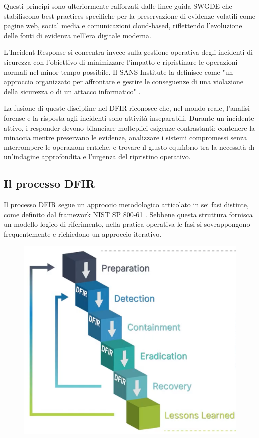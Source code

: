 Questi principi sono ulteriormente rafforzati dalle linee guida SWGDE \cite{swgde2022} che stabiliscono best practices specifiche per la preservazione di evidenze volatili come pagine web, social media e comunicazioni cloud-based, riflettendo l'evoluzione delle fonti di evidenza nell'era digitale moderna.

L'Incident Response si concentra invece sulla gestione operativa degli incidenti di sicurezza con l'obiettivo di minimizzare l'impatto e ripristinare le operazioni normali nel minor tempo possibile. Il SANS Institute la definisce come "un approccio organizzato per affrontare e gestire le conseguenze di una violazione della sicurezza o di un attacco informatico" \cite{sans2023}.

La fusione di queste discipline nel DFIR riconosce che, nel mondo reale, l'analisi forense e la risposta agli incidenti sono attività inseparabili. Durante un incidente attivo, i responder devono bilanciare molteplici esigenze contrastanti: contenere la minaccia mentre preservano le evidenze, analizzare i sistemi compromessi senza interrompere le operazioni critiche, e trovare il giusto equilibrio tra la necessità di un'indagine approfondita e l'urgenza del ripristino operativo.

\subsection{Il processo DFIR}

Il processo DFIR segue un approccio metodologico articolato in sei fasi distinte, come definito dal framework NIST SP 800-61 \cite{cichonski2012}. Sebbene questa struttura fornisca un modello logico di riferimento, nella pratica operativa le fasi si sovrappongono frequentemente e richiedono un approccio iterativo.

\begin{figure}[H]
    \centering
    \includegraphics[width=0.6\linewidth]{images/stato-arte/digital-forensics-incident-response-plan-flow.png}
\end{figure}

